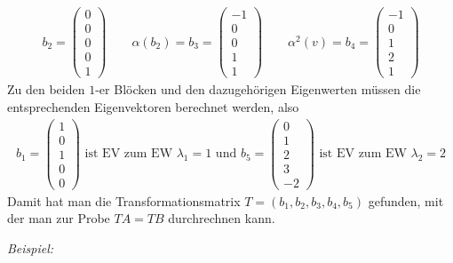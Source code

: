     \begin{align*}
        b_2 = 
        \begin{pmatrix}
            0\\0\\0\\0\\1
        \end{pmatrix}
        \qquad \alpha(b_2) = b_3 =
        \begin{pmatrix}
            -1\\0\\0\\1\\1
        \end{pmatrix} \qquad \alpha^2(v) = b_4 =
        \begin{pmatrix}
            -1\\0\\1\\2\\1
        \end{pmatrix}
    \end{align*}
    Zu den beiden $1$-er Blöcken und den dazugehörigen Eigenwerten müssen die entsprechenden Eigenvektoren berechnet werden, also
    \begin{align*}
        b_1 =
        \begin{pmatrix}
            1\\0\\1\\0\\0
        \end{pmatrix}
        \text{ ist EV zum EW }\lambda_1 = 1 \text{ und } b_5 =
        \begin{pmatrix}
            0\\1\\2\\3\\-2
        \end{pmatrix} \text{ ist EV zum EW }
        \lambda_2 = 2
    \end{align*}
    Damit hat man die Transformationsmatrix $T=(b_1,b_2,b_3,b_4,b_5)$ gefunden, mit der man zur Probe $TA = TB$ durchrechnen kann.


\textit{Beispiel:}

